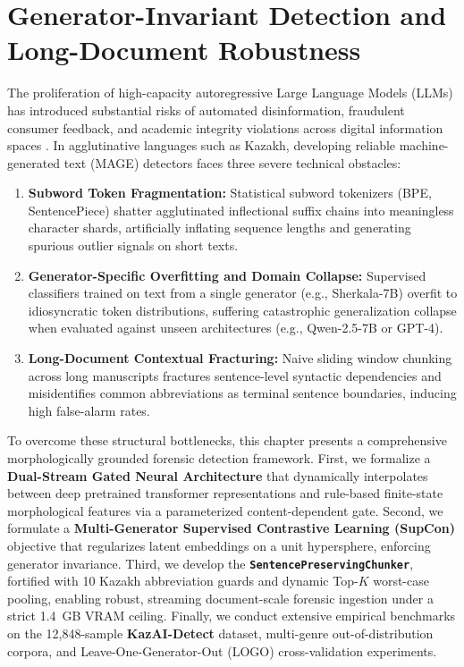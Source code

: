 \chapter{Generator-Invariant Detection and Long-Document Robustness}
\label{chap:morpho_contrastive_detection}

The proliferation of high-capacity autoregressive Large Language Models (LLMs) has introduced substantial risks of automated disinformation, fraudulent consumer feedback, and academic integrity violations across digital information spaces \citep{uchendu2020authorship,sadasivan2023can,wang2024raid}. In agglutinative languages such as Kazakh, developing reliable machine-generated text (MAGE) detectors faces three severe technical obstacles:
\begin{enumerate}
    \item \textbf{Subword Token Fragmentation:} Statistical subword tokenizers (BPE, SentencePiece) shatter agglutinated inflectional suffix chains into meaningless character shards, artificially inflating sequence lengths and generating spurious outlier signals on short texts.
    \item \textbf{Generator-Specific Overfitting and Domain Collapse:} Supervised classifiers trained on text from a single generator (e.g., Sherkala-7B) overfit to idiosyncratic token distributions, suffering catastrophic generalization collapse when evaluated against unseen architectures (e.g., Qwen-2.5-7B or GPT-4).
    \item \textbf{Long-Document Contextual Fracturing:} Naive sliding window chunking across long manuscripts fractures sentence-level syntactic dependencies and misidentifies common abbreviations as terminal sentence boundaries, inducing high false-alarm rates.
\end{enumerate}

To overcome these structural bottlenecks, this chapter presents a comprehensive morphologically grounded forensic detection framework. First, we formalize a \textbf{Dual-Stream Gated Neural Architecture} that dynamically interpolates between deep pretrained transformer representations and rule-based finite-state morphological features via a parameterized content-dependent gate. Second, we formulate a \textbf{Multi-Generator Supervised Contrastive Learning (SupCon)} objective that regularizes latent embeddings on a unit hypersphere, enforcing generator invariance. Third, we develop the \textbf{\texttt{SentencePreservingChunker}}, fortified with 10 Kazakh abbreviation guards and dynamic Top-$K$ worst-case pooling, enabling robust, streaming document-scale forensic ingestion under a strict 1.4~GB VRAM ceiling. Finally, we conduct extensive empirical benchmarks on the 12,848-sample \textbf{KazAI-Detect} dataset, multi-genre out-of-distribution corpora, and Leave-One-Generator-Out (LOGO) cross-validation experiments.

